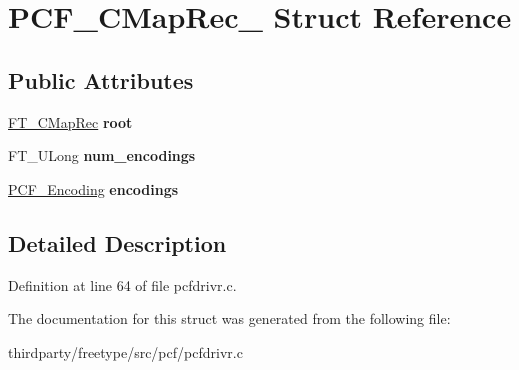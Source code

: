 \hypertarget{struct_p_c_f___c_map_rec__}{}\section{P\+C\+F\+\_\+\+C\+Map\+Rec\+\_\+ Struct Reference}
\label{struct_p_c_f___c_map_rec__}
\subsection*{Public Attributes}
\begin{DoxyCompactItemize}
\item 
\mbox{\label{struct_p_c_f___c_map_rec___aa3ad854a757574253179a70833a9846a}} 
\hyperlink{struct_f_t___c_map_rec__}{F\+T\+\_\+\+C\+Map\+Rec} {\bfseries root}
\item 
\mbox{\label{struct_p_c_f___c_map_rec___a208fa462668d783f45cfc18d942c73f4}} 
F\+T\+\_\+\+U\+Long {\bfseries num\+\_\+encodings}
\item 
\mbox{\label{struct_p_c_f___c_map_rec___aa7ac931b4d2793f5c3082fdc188af6b2}} 
\hyperlink{struct_p_c_f___encoding_rec__}{P\+C\+F\+\_\+\+Encoding} {\bfseries encodings}
\end{DoxyCompactItemize}


\subsection{Detailed Description}


Definition at line 64 of file pcfdrivr.\+c.



The documentation for this struct was generated from the following file\+:\begin{DoxyCompactItemize}
\item 
thirdparty/freetype/src/pcf/pcfdrivr.\+c\end{DoxyCompactItemize}
